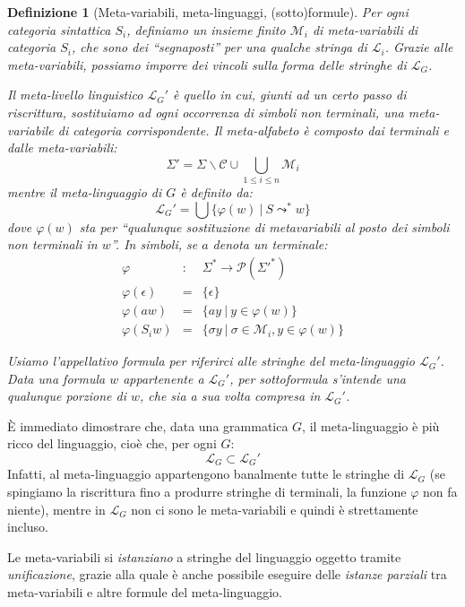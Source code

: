 \documentclass[12pt,a4paper,openright,twoside]{report}
\newtheorem{dfn}[thm]{Definizione}
\begin{document}
\begin{dfn}[Meta-variabili, meta-linguaggi, (sotto)formule]
Per ogni categoria sintattica $S_i$, definiamo un insieme finito $\mathscr{M}_i$ di \emph{meta-variabili} di categoria $S_i$, che sono dei ``segnaposti'' per una qualche stringa di $\mathscr{L}_i$. Grazie alle meta-variabili, possiamo imporre dei vincoli sulla forma delle stringhe di $\mathscr{L}_G$.

Il \emph{meta-livello linguistico} $\mathscr{L}_G'$ \`e quello in cui, giunti ad un certo passo di riscrittura, sostituiamo ad ogni occorrenza di simboli non terminali, una meta-variabile di categoria corrispondente. Il \emph{meta-alfabeto} \`e composto dai terminali e dalle meta-variabili:
$$
	\Sigma' = \Sigma{\smallsetminus}\mathcal{C} \cup \bigcup_{1 \le i \le n}\mathscr{M}_i
$$
mentre il \emph{meta-linguaggio} di $G$ \`e definito da:
$$
	\mathscr{L}_G' = \bigcup \{ \varphi(w) \:|\: S \leadsto^* w \}
$$
dove $\varphi(w)$ sta per ``qualunque sostituzione di metavariabili al posto dei simboli non terminali in $w$''. In simboli, se $a$ denota un terminale:
\begin{eqnarray*}
	\varphi & : & \Sigma^* \rightarrow \mathscr{P}(\Sigma'^*) \\
	\varphi(\epsilon) & = & \{ \epsilon \} \\
	\varphi(a w) & = & \{ a y \:|\: y \in \varphi(w) \} \\
	\varphi(S_i w) & = & \{ \sigma y \:|\: \sigma \in \mathscr{M}_i, y \in \varphi(w) \}
\end{eqnarray*}

Usiamo l'appellativo \emph{formula} per riferirci alle stringhe del meta-linguaggio $\mathscr{L}_G'$. Data una formula $w$ appartenente a $\mathscr{L}_G'$, per \emph{sottoformula} s'intende una qualunque porzione di $w$, che sia a sua volta compresa in $\mathscr{L}_G'$.
\end{dfn}

\`E immediato dimostrare che, data una grammatica $G$, il meta-linguaggio \`e pi\`u ricco del linguaggio, cio\`e che, per ogni $G$:
$$
	\mathscr{L}_G \subset \mathscr{L}_G'
$$
Infatti, al meta-linguaggio appartengono banalmente tutte le stringhe di $\mathscr{L}_G$ (se spingiamo la riscrittura fino a produrre stringhe di terminali, la funzione $\varphi$ non fa niente), mentre in $\mathscr{L}_G$ non ci sono le meta-variabili e quindi \`e strettamente incluso. 

Le meta-variabili si \emph{istanziano} a stringhe del linguaggio oggetto tramite \emph{unificazione}, grazie alla quale \`e anche possibile eseguire delle \emph{istanze parziali} tra meta-variabili e altre formule del meta-linguaggio.
\end{document}
